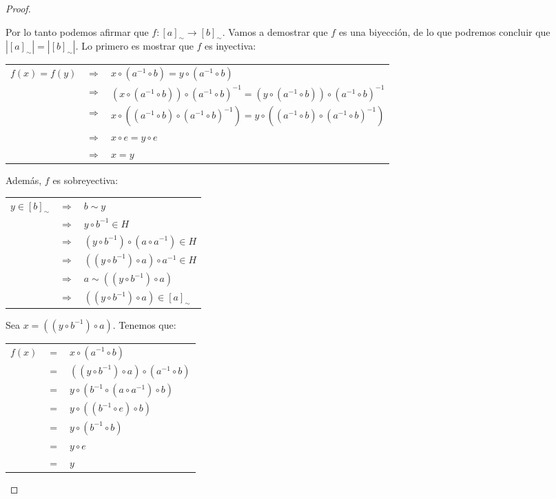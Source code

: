 \begin{proof}
\begin{enumerate}
Por lo tanto podemos afirmar que $f : [a]_\sim \to [b]_\sim$. Vamos a demostrar que $f$ es una biyección, de lo que podremos
concluir que $|[a]_\sim| = |[b]_\sim|$.  
Lo primero es mostrar que $f$ es inyectiva:

\begin{center}
\begin{tabular}{lcl}
$f(x) = f(y)$ & $\Rightarrow$ & $x \circ (a^{-1} \circ b) = y \circ
(a^{-1} \circ b)$\\
& $\Rightarrow$ & $(x \circ (a^{-1} \circ b)) \circ (a^{-1} \circ b)^{-1}
= (y \circ (a^{-1} \circ b)) \circ (a^{-1} \circ b)^{-1}$\\
& $\Rightarrow$ & $x \circ ((a^{-1} \circ b) \circ (a^{-1} \circ b)^{-1})
= y \circ ((a^{-1} \circ b) \circ (a^{-1} \circ b)^{-1})$\\
& $\Rightarrow$ & $x \circ e = y \circ e$\\
& $\Rightarrow$ & $x = y$
\end{tabular}
\end{center}

Además, $f$ es sobreyectiva:

\begin{center}
\begin{tabular}{lcl}
$y \in [b]_\sim$ & $\Rightarrow$ & $b \sim y$\\
& $\Rightarrow$ & $y \circ b^{-1} \in H$\\
& $\Rightarrow$ & $(y \circ b^{-1}) \circ (a \circ a^{-1}) \in H$\\
& $\Rightarrow$ & $((y \circ b^{-1}) \circ a) \circ a^{-1} \in H$\\
& $\Rightarrow$ & $a \sim ((y \circ b^{-1}) \circ a)$\\
& $\Rightarrow$ & $((y \circ b^{-1}) \circ a) \in [a]_\sim$
\end{tabular}
\end{center}

Sea $x = ((y \circ b^{-1}) \circ a)$. Tenemos que:
\begin{center}
\begin{tabular}{lcl}
$f(x)$ & $=$ & $x \circ (a^{-1} \circ b)$\\
& $=$ & $((y \circ b^{-1}) \circ a) \circ (a^{-1} \circ b)$\\
& $=$ & $y \circ (b^{-1} \circ (a \circ a^{-1}) \circ b)$\\
& $=$ & $y \circ ((b^{-1} \circ e) \circ b)$\\
& $=$ & $y \circ (b^{-1} \circ b)$\\
& $=$ & $y \circ e$\\
& $=$ & $y$ 
\end{tabular}
\end{center}

\end{enumerate}

\end{proof}
